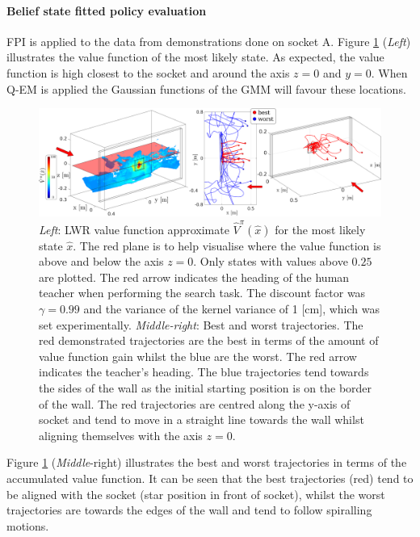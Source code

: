 \documentclass[final,5p,times,twocolumn]{elsarticle}
\begin{document}
\paragraph{Belief state fitted policy evaluation}

FPI is applied to the data from demonstrations done on socket A. Figure \ref{fig:ch4:Figure1} (\textit{Left}) illustrates 
the value function of the most likely state. As expected, the value function is high closest to the socket and around the axis $z=0$ and $y=0$. 
When Q-EM is applied the Gaussian functions of the GMM will favour these locations. 

\begin{figure}
 \centering
 \includegraphics[width=\linewidth]{./Figure/value_function_belief.pdf}
 \caption{\textit{Left}: LWR value function approximate $\hat{V}^{\pi}(\hat{x})$ for the most likely state $\hat{x}$. 
 The red plane is to help visualise where the value function is above and below the axis $z=0$. Only states with values above
 $0.25$ are plotted.  The red arrow indicates the heading of the human teacher when performing the search task. The discount 
 factor was $\gamma=0.99$ and the variance of the kernel variance of 1 [cm], which was set experimentally.
 \textit{Middle-right}: Best and worst trajectories. The red demonstrated trajectories are the best in terms of the amount of value function 
 gain whilst the blue are the worst. The red arrow indicates the teacher's heading. The blue trajectories tend 
 towards the sides of the wall as the initial starting position is on the border of the wall. The red trajectories are centred along the y-axis of socket and tend to move in a straight line towards 
 the wall whilst aligning themselves with the axis $z=0$.
}
 \label{fig:ch4:Figure1}
\end{figure}

Figure \ref{fig:ch4:Figure1} (\textit{Middle}-right) illustrates the best and worst trajectories in terms of the accumulated value function.
It can be seen that the best trajectories (red) tend to be aligned with the socket (star position in front of socket), 
whilst the worst trajectories are towards the edges of the wall and tend to follow spiralling motions. 
\end{document}
